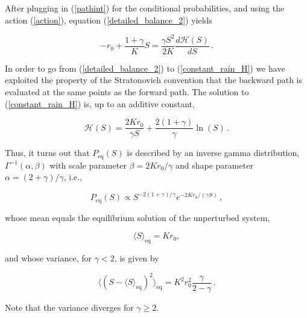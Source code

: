 \documentclass[11pt, a4paper]{article}
\newcommand{\eq}{\text{eq}}
\begin{document}
After plugging in (\ref{pathint}) for the conditional probabilities, and using the action (\ref{action}), equation (\ref{detailed_balance_2}) yields

\begin{equation}\label{constant_rain_H}
-r_{0}+\frac{1+\gamma}{K}S
=
\frac{\gamma S^2}{2K}
\frac{d \mathcal{H}(S)}{dS}\,.
\end{equation}

In order to go from (\ref{detailed_balance_2}) to (\ref{constant_rain_H}) we have exploited the property of the Stratonovich convention that the backward path is evaluated at the same points as the forward path. The solution to (\ref{constant_rain_H}) is, up to an additive constant,

\begin{equation}\label{solution_const_rain}
\mathcal{H}(S)=\frac{2 K r_0}{\gamma S}+\frac{2(1+\gamma)}{\gamma}\ln(S)\,.
\end{equation}


Thus, it turns out that $P_{\text{eq}}(S)$ is described by an inverse gamma distribution, $\Gamma^{-1}(\alpha,\beta)$ with scale parameter $\beta=2Kr_{0}/\gamma$ and shape parameter $\alpha=(2+\gamma)/\gamma$, i.e.,

\begin{equation}\label{inverse_gamma}
  P_{\text{eq}}(S)
  \propto
  S^{-2(1+\gamma)/\gamma}e^{-2Kr_{0}/(\gamma S)}\,,
\end{equation}

whose mean equals the equilibrium solution of the unperturbed system,

\begin{equation}
  \langle S\rangle_{\eq}=Kr_{0},
\end{equation}

and whose variance, for $\gamma< 2$, is given by

\begin{equation}
  \langle (S - \langle S\rangle_{\eq})^2\rangle_{\eq}
  =
  K^2r_{0}^2
  \frac{\gamma}{2-\gamma}\,.
\end{equation}

Note that the variance diverges for $\gamma\geq 2$.
\end{document}
